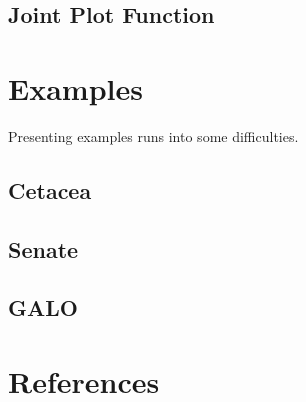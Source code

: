 \documentclass[
  12pt,
]{article}
\begin{document}
\subsection{Joint Plot Function}\label{joint-plot-function}

\section{Examples}\label{examples}

Presenting examples runs into some difficulties.

\subsection{Cetacea}\label{cetacea}

\subsection{Senate}\label{senate}

\subsection{GALO}\label{galo}

\section*{References}\label{references}
\end{document}
